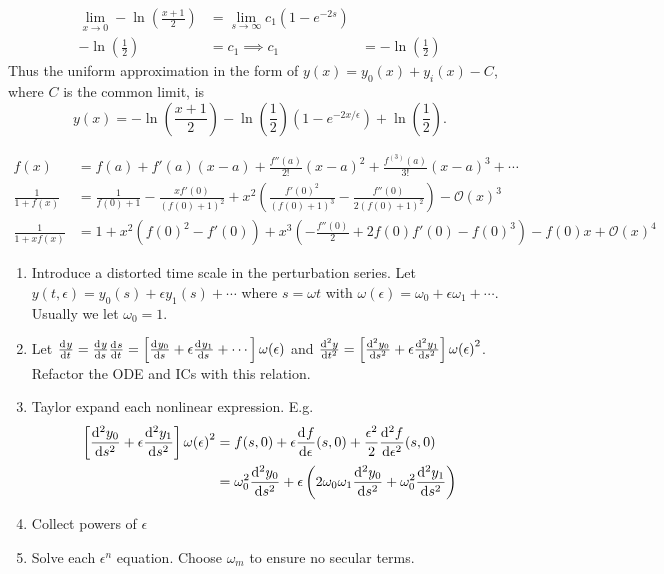 \begin{description}
{\begin{equation*}
        \begin{aligned}
          \lim_{x\rightarrow0}-\ln\left(\frac{x+1}{2}\right) &= \lim_{s\rightarrow\infty}c_1(1-e^{-2s}) \\
          -\ln\left(\frac{1}{2}\right) &= c_1
          \implies c_1 &= -\ln\left(\frac{1}{2}\right)
        \end{aligned}
      \end{equation*}
      Thus the uniform approximation in the form of $y(x)=y_0(x)+y_i(x)-C$, where $C$
      is the common limit, is
      \begin{equation*}
        \boxed{y(x)=-\ln\left( \frac{x+1}{2} \right) -
          \ln\left(\frac{1}{2}\right)(1-e^{-2x/\epsilon}) +
          \ln\left( \frac{1}{2} \right).}
      \end{equation*}
    }

  \end{description}

\item[Taylor Series]
  {\tiny
    \begin{align*}
      f(x) &= f(a)+f'(a)(x-a)+\frac{f''(a)}{2!}{(x-a)}^2+\frac{f^{(3)}(a)}{3!}{(x-a)}^3+\cdots \\
      \frac{1}{1+f(x)} &= \frac{1}{{f(0)}+1}-\frac{x f'(0)}{{(f(0)+1)}^2}+x^2
                         \left(\frac{{f'(0)}^2}{{(f(0)+1)}^3}-\frac{f''(0)}{2 {(f(0)+1)}^2}\right)- {\mathcal{O}(x)}^3 \\
      \frac{1}{1+x f(x)} &= 1 + x^2 \left({f(0)}^2-f'(0)\right)+x^3
                           \left(-\frac{f''(0)}{2}+2 f(0) f'(0)-{f(0)}^3\right)-f(0) x + {\mathcal{O}(x)}^4
    \end{align*}
  }
\item[Poincar\'e-Lindstedt Method] \hfill
  \begin{enumerate}
  \item Introduce a distorted time scale in the perturbation series. Let
    $y(t,\epsilon)=y_0(s) + \epsilon y_1(s) + \cdots$ where $s=\omega t$ with
    $\omega(\epsilon) = \omega_0 + \epsilon\omega_1 + \cdots$. Usually we let
    $\omega_0=1$.
  \item Let $\od{y}{t}=\od{y}{s}\od{s}{t}=\left[\od{y_0}{s} +
      \epsilon\od{y_1}{s} + \cdots\right] \omega(\epsilon)$ and
    $\od[2]{y}{t}=\left[\od[2]{y_0}{s} +
      \epsilon\od[2]{y_1}{s}\right]{\omega(\epsilon)}^2$. Refactor the ODE and
    ICs with this relation.
  \item Taylor expand each nonlinear expression. E.g.
    \begin{align*}
      \left[ \od[2]{y_0}{s}+\epsilon\od[2]{y_1}{s} \right]{\omega(\epsilon)}^2
      &= f(s,0)+\epsilon\od{f}{\epsilon}(s,0) +
        \frac{\epsilon^2}{2}\od[2]{f}{\epsilon}(s,0) \\
      &= \omega_0^2 \od[2]{y_0}{s} + \epsilon\left(2\omega_0\omega_1\od[2]{y_0}{s} +
        \omega_0^2\od[2]{y_1}{s}\right) \
    \end{align*}
  \item Collect powers of $\epsilon$
  \item Solve each $\epsilon^n$ equation. Choose $\omega_m$ to ensure no secular
    terms.
  \end{enumerate}

